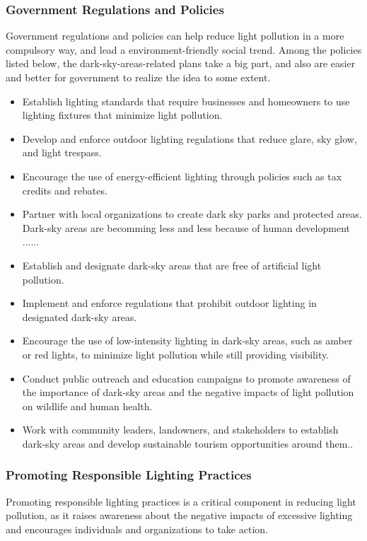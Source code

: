 \subsubsection{Government Regulations and Policies}
Government regulations and policies can help reduce light pollution in a more compulsory way, and lead a environment-friendly social trend. Among the policies listed below, the dark-sky-areas-related plans take a big part, and also are easier and better for government to realize the idea to some extent.
\begin{itemize}
    \item Establish lighting standards that require businesses and homeowners to use lighting fixtures that minimize light pollution.
    
    \item Develop and enforce outdoor lighting regulations that reduce glare, sky glow, and light trespass.
    
    \item Encourage the use of energy-efficient lighting through policies such as tax credits and rebates.
    \item Partner with local organizations to create dark sky parks and protected areas.
    Dark-sky areas are becomming less and less because of human development ......

    \item Establish and designate dark-sky areas that are free of artificial light pollution.

    \item Implement and enforce regulations that prohibit outdoor lighting in designated dark-sky areas.

    \item Encourage the use of low-intensity lighting in dark-sky areas, such as amber or red lights, to minimize light pollution while still providing visibility.

    \item Conduct public outreach and education campaigns to promote awareness of the importance of dark-sky areas and the negative impacts of light pollution on wildlife and human health.

    \item Work with community leaders, landowners, and stakeholders to establish dark-sky areas and develop sustainable tourism opportunities around them..
\end{itemize}


\subsubsection{Promoting Responsible Lighting Practices}
Promoting responsible lighting practices is a critical component in reducing light pollution, as it raises awareness about the negative impacts of excessive lighting and encourages individuals and organizations to take action. 

